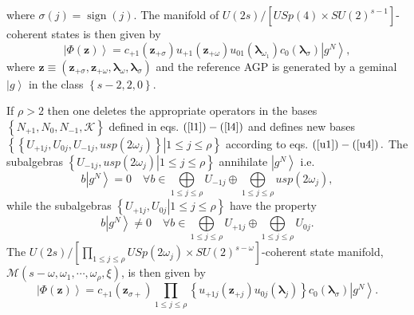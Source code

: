 \documentclass[12pt,aps,amsfonts,amssymb,tightenlines]{revtex4}%
\begin{document}
where $\sigma\left(  j\right)  =\operatorname{sign}\left(  j\right)  .$ The
manifold of $U\left(  2s\right)  /\left[  USp\left(  4\right)  \times
SU\left(  2\right)  ^{s-1}\right]  $-coherent states is then given by
\begin{equation}
\left\vert \Phi\left(  \mathbf{z}\right)  \right\rangle =c_{+1}\left(
\mathbf{z}_{+\sigma}\right)  u_{+1}\left(  \mathbf{z}_{+\omega}\right)
u_{01}\left(  \mathbf{\lambda}_{\omega_{1}}\right)  c_{0}\left(
\mathbf{\lambda}_{\sigma}\right)  \left\vert g^{N}\right\rangle ,
\end{equation}
where $\mathbf{z\equiv}\left(  \mathbf{z}_{+\sigma},\mathbf{z}_{+\omega
},\mathbf{\lambda}_{\omega},\mathbf{\lambda}_{\sigma}\right)  $ and the
reference AGP is generated by a geminal $\left\vert g\right\rangle $ in the
class $\left\{  s-2,2,0\right\}  .$

If $\rho>2$ then one deletes the appropriate operators in the bases $\left\{
N_{+1},N_{0},N_{-1},\mathcal{K}\right\}  $ defined in eqs. $\left(
\ref{l1}\right)  -\left(  \ref{l4}\right)  $ and defines new bases $\left\{
\left.  \left\{  U_{+1j},U_{0j},U_{-1j},usp\left(  2\omega_{j}\right)
\right\}  \right\vert 1\leq j\leq\rho\right\}  $ according to eqs. $\left(
\ref{u1}\right)  -\left(  \ref{u4}\right)  .$ The subalgebras $\left\{
\left.  U_{-1j},usp\left(  2\omega_{j}\right)  \right\vert 1\leq j\leq
\rho\right\}  $ annihilate $\left\vert g^{N}\right\rangle $ i.e.
\begin{equation}
b\left\vert g^{N}\right\rangle =0\quad\forall b\in\bigoplus\limits_{1\leq
j\leq\rho}U_{-1j}\oplus\bigoplus\limits_{1\leq j\leq\rho}usp\left(
2\omega_{j}\right)  ,
\end{equation}
while the subalgebras $\left\{  \left.  U_{+1j},U_{0j}\right\vert 1\leq
j\leq\rho\right\}  $ have the property
\begin{equation}
b\left\vert g^{N}\right\rangle \neq0\quad\forall b\in\bigoplus\limits_{1\leq
j\leq\rho}U_{+1j}\oplus\bigoplus\limits_{1\leq j\leq\rho}U_{0j}.
\end{equation}
The $U\left(  2s\right)  /\left[
{\textstyle\prod_{1\leq j\leq\rho}}
USp\left(  2\omega_{j}\right)  \times SU\left(  2\right)  ^{s-\omega}\right]
$-coherent state manifold, $\mathcal{M}\left(  s-\omega,\omega_{1}%
,\cdots,\omega_{\rho},\xi\right)  $, is then given by
\begin{equation}
\left\vert \Phi\left(  \mathbf{z}\right)  \right\rangle =c_{+1}\left(
\mathbf{z}_{\sigma+}\right)
{\textstyle\prod_{1\leq j\leq\rho}}
\left\{  u_{+1j}\left(  \mathbf{z}_{+j}\right)  u_{0j}\left(  \mathbf{\lambda
}_{j}\right)  \right\}  c_{0}\left(  \mathbf{\lambda}_{\sigma}\right)
\left\vert g^{N}\right\rangle .
\end{equation}
\end{document}
